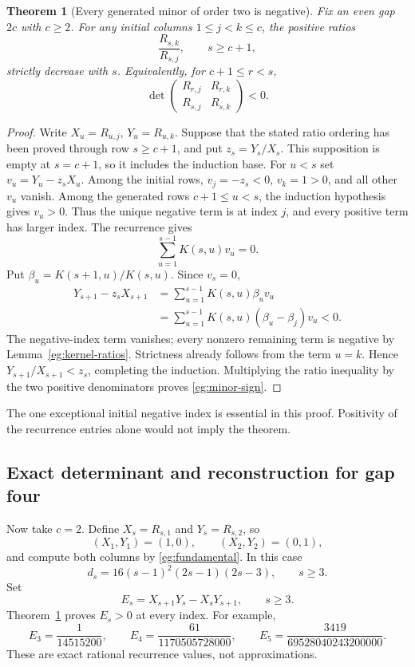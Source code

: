 \documentclass[11pt]{article}
\newtheorem{theorem}{Theorem}[section]
\theoremstyle{definition}
\theoremstyle{remark}
\numberwithin{equation}{section}
\begin{document}
\begin{theorem}[Every generated minor of order two is negative]
\label{eg:two-minors}
Fix an even gap $2c$ with $c\ge2$. For any initial columns
$1\le j<k\le c$, the positive ratios
\[
                   \frac{R_{s,k}}{R_{s,j}},\qquad s\ge c+1,
\]
strictly decrease with $s$. Equivalently, for $c+1\le r<s$,
\begin{equation}\label{eg:minor-sign}
 \det\begin{pmatrix}R_{r,j}&R_{r,k}\\R_{s,j}&R_{s,k}\end{pmatrix}<0.
\end{equation}
\end{theorem}

\begin{proof}
Write $X_u=R_{u,j}$, $Y_u=R_{u,k}$. Suppose that the stated ratio
ordering has been proved through row $s\ge c+1$, and put
$z_s=Y_s/X_s$. This supposition is empty at $s=c+1$, so it includes
the induction base. For $u<s$ set $v_u=Y_u-z_sX_u$. Among the initial
rows, $v_j=-z_s<0$, $v_k=1>0$, and all other $v_u$ vanish. Among
the generated rows $c+1\le u<s$, the induction hypothesis gives
$v_u>0$. Thus the unique negative term is at index $j$, and every
positive term has larger index. The recurrence gives
\[
                     \sum_{u=1}^{s-1}K(s,u)v_u=0.
\]
Put $\beta_u=K(s+1,u)/K(s,u)$. Since $v_s=0$,
\begin{align*}
 Y_{s+1}-z_sX_{s+1}
 &=\sum_{u=1}^{s-1}K(s,u)\beta_uv_u\\
 &=\sum_{u=1}^{s-1}K(s,u)(\beta_u-\beta_j)v_u<0.
\end{align*}
The negative-index term vanishes; every nonzero remaining term is
negative by Lemma~\ref{eg:kernel-ratios}. Strictness already follows
from the term $u=k$. Hence $Y_{s+1}/X_{s+1}<z_s$, completing the
induction. Multiplying the ratio inequality by the two positive
denominators proves \eqref{eg:minor-sign}.
\end{proof}

The one exceptional initial negative index is essential in this proof.
Positivity of the recurrence entries alone would not imply the theorem.

\subsection{Exact determinant and reconstruction for gap four}

Now take $c=2$. Define $X_s=R_{s,1}$ and $Y_s=R_{s,2}$, so
\[
 (X_1,Y_1)=(1,0),\qquad (X_2,Y_2)=(0,1),
\]
and compute both columns by \eqref{eg:fundamental}. In this case
\begin{equation}\label{eg:d-gapfour}
 d_s=16(s-1)^2(2s-1)(2s-3),\qquad s\ge3.
\end{equation}
Set
\begin{equation}\label{eg:casoratian}
 E_s=X_{s+1}Y_s-X_sY_{s+1},\qquad s\ge3.
\end{equation}
Theorem~\ref{eg:two-minors} proves $E_s>0$ at every index. For example,
\[
 E_3=\frac1{14515200},\qquad
 E_4=\frac{61}{1170505728000},\qquad
 E_5=\frac{3419}{69528040243200000}.
\]
These are exact rational recurrence values, not approximations.
\end{document}
